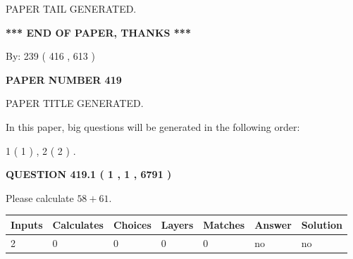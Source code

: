 \documentclass[12pt]{article}
\begin{document}
   
   
\vspace{2.0in} PAPER TAIL GENERATED.
   
   
   
   
\vspace{1.0in} 
{\textbf{\large{ *** END OF PAPER, THANKS *** }}} 
   
   
\hspace{1.0in} By: 
 239 ( 416 ,  613 )
   
   
   
   
\newpage 
\setcounter{page}{ 
   419001 } 
   
   
   
   
 {\textbf{ \Large{ PAPER NUMBER  419  }}}
   
   
\vspace{0.2in}
   
   
   
   
   
   
   
   
 \vspace{0.2in}
 
 
 
 
   
   
 PAPER TITLE GENERATED.
   
   
   
\vspace{0.2in}
   
In this paper, big questions will be generated in the following order: 
   
   
   1 ( 1 )
 ,
   2 ( 2 )
 .
  
\vspace{0.2in}
  
{\textbf{\Large{QUESTION
419.1 
 ( 1 , 1 , 6791 )
}}}
  
  
 
Please calculate $ %
58 +  %
61 $.
 
 
   
   
   
   
\noindent\begin{tabular}{|l|l|l|l|l|l|l|}
 \hline
Inputs & Calculates & Choices & Layers & Matches & Answer & Solution \\ \hline
 2  & 
 0  & 
 0
  & 
 0  & 
 0  & 
  no & 
  no 
  \\ \hline
 \end{tabular}
   
\end{document}
